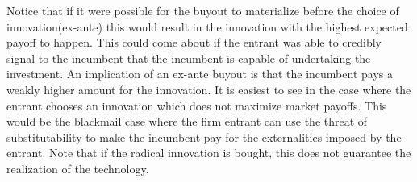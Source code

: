 Notice that if it were possible for the buyout to materialize before the choice of innovation(ex-ante) this would result in the innovation with the highest expected payoff to happen. This could come about if the entrant was able to credibly signal to the incumbent that the incumbent is capable of undertaking the investment. An implication of an ex-ante buyout is that the incumbent pays a weakly higher amount for the innovation. It is easiest to see in the case where the entrant chooses an innovation which does not maximize market payoffs. This would be the blackmail case where the firm entrant can use the threat of substitutability to make the incumbent pay for the externalities imposed by the entrant. Note that if the radical innovation is bought, this does not guarantee the realization of the technology. 
